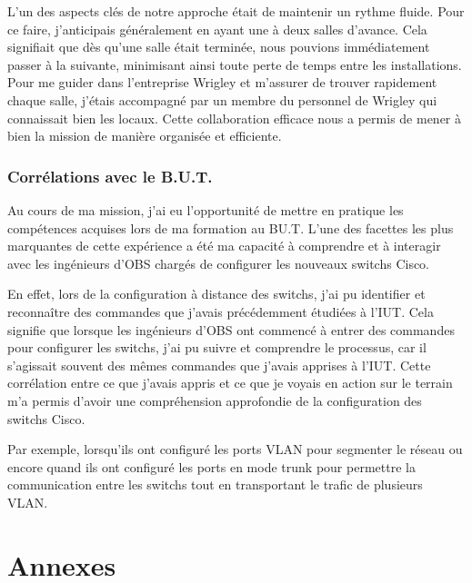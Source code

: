 \documentclass[12pt, a4paper]{article}
\begin{document}
L'un des aspects clés de notre approche était de maintenir un
rythme fluide. Pour ce faire, j'anticipais généralement en ayant
une à deux salles d'avance. Cela signifiait
que dès qu'une salle était terminée, nous pouvions immédiatement
passer à la suivante, minimisant ainsi toute perte de temps entre
les installations. Pour me guider dans l'entreprise Wrigley et
m'assurer de trouver rapidement chaque salle, j'étais accompagné
par un membre du personnel de Wrigley qui connaissait bien les locaux.
Cette collaboration efficace nous a permis de mener à bien la mission
de manière organisée et efficiente.

\subsubsection{Corrélations avec le B.U.T.}
Au cours de ma mission, j'ai eu l'opportunité de mettre en
pratique les compétences acquises lors de ma formation au BU.T.
L'une des facettes les plus marquantes de cette expérience a
été ma capacité à comprendre et à interagir avec les ingénieurs
d'OBS chargés de configurer les nouveaux switchs Cisco.

En effet, lors de la configuration à distance des switchs,
j'ai pu identifier et reconnaître des commandes que j'avais
précédemment étudiées à l'IUT. Cela signifie que lorsque les
ingénieurs d'OBS ont commencé à entrer des commandes pour
configurer les switchs, j'ai pu suivre et comprendre le processus,
car il s'agissait souvent des mêmes commandes que j'avais apprises à
l'IUT. Cette corrélation entre ce que j'avais appris et ce que
je voyais en action sur le terrain m'a permis d'avoir une
compréhension approfondie de la configuration des switchs Cisco.

Par exemple, lorsqu'ils ont configuré les ports VLAN
pour segmenter le réseau ou encore quand ils ont 
configuré les ports en mode trunk pour permettre
la communication entre les switchs tout en 
transportant le trafic de plusieurs VLAN.\\ 

\newpage
\section{Annexes}
\end{document}
